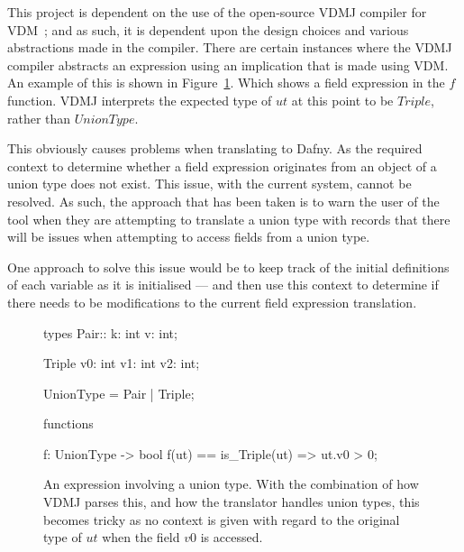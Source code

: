 \documentclass{entcs}
\begin{document}
This project  is dependent on the use of the open-source VDMJ compiler for VDM~\cite{VDMJ}; and as such, it is dependent upon the design choices and various abstractions made in the compiler. There are certain instances where the VDMJ compiler abstracts an expression using an implication that is made using VDM. An example of this is shown in Figure~\ref{fig:bad_field_expressions}. Which shows a field expression in the $f$ function. VDMJ interprets the expected type of $ut$ at this point to be $Triple$, rather than $UnionType$. 

This obviously causes problems when translating to Dafny. As the required context to determine whether a field expression originates from an object of a union type does not exist. This issue, with the current system, cannot be resolved. As such, the approach that has been taken is to warn the user of the tool when they are attempting to translate a union type with records that there will be issues when attempting to access fields from a union type.

One approach to solve this issue would be to keep track of the initial definitions of each variable as it is initialised --- and then use this context to determine if there needs to be modifications to the current field expression translation.

\begin{figure}[h]
	\begin{center}
        \begin{vdmsl}
types 
Pair::
    k: int 
    v: int;

Triple
    v0: int
    v1: int
    v2: int;

UnionType = Pair | Triple;

functions 

f: UnionType -> bool
f(ut) == is_Triple(ut) => ut.v0 > 0;
        \end{vdmsl}
		\caption{An expression involving a union type. With the combination of how VDMJ parses this, and how the translator handles union types, this becomes tricky as no context is given with regard to the original type of $ut$ when the field $v0$ is accessed.}\label{fig:bad_field_expressions}
	\end{center}
\end{figure}
\end{document}

